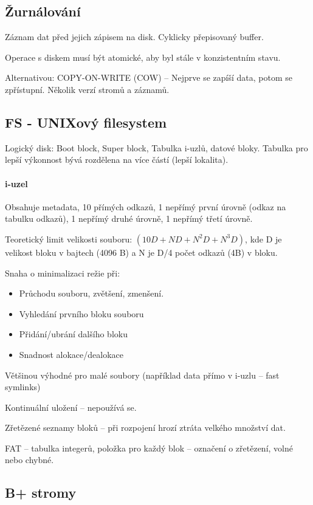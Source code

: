 \documentclass[a4paper, 11pt]{report}
\begin{document}
\subsection{Žurnálování}

Záznam dat před jejich zápisem na disk. Cyklicky přepisovaný buffer.

Operace s diskem musí být atomické, aby byl stále v konzistentním stavu.

Alternativou: COPY-ON-WRITE (COW) -- Nejprve se zapíší data, potom se zpřístupní. Několik verzí stromů a záznamů.

\subsection{FS - UNIXový filesystem}
Logický disk: Boot block, Super block, Tabulka i-uzlů, datové bloky. Tabulka pro lepší výkonnost bývá rozdělena na více částí (lepší lokalita).

\paragraph{i-uzel}

Obsahuje metadata, 10 přímých odkazů, 1 nepřímý první úrovně (odkaz na tabulku odkazů), 1 nepřímý druhé úrovně, 1 nepřímý třetí úrovně.

Teoretický limit velikosti souboru: $(10 D + N D + N^2 D + N^3 D)$, kde D je velikost bloku v bajtech (4096 B) a N je D/4 počet odkazů (4B) v bloku.

Snaha o minimalizaci režie při:
\begin{itemize}
	\item Průchodu souboru, zvětšení, zmenšení.
	\item Vyhledání prvního bloku souboru
	\item Přidání/ubrání dalšího bloku
	\item Snadnost alokace/dealokace
\end{itemize}

Většinou výhodné pro malé soubory (například data přímo v i-uzlu -- fast symlinks)

Kontinuální uložení -- nepoužívá se.

Zřetězené seznamy bloků -- při rozpojení hrozí ztráta velkého množství dat.

FAT -- tabulka integerů, položka pro každý blok -- označení o zřetězení, volné nebo chybné.

\subsection{B+ stromy}
\end{document}
